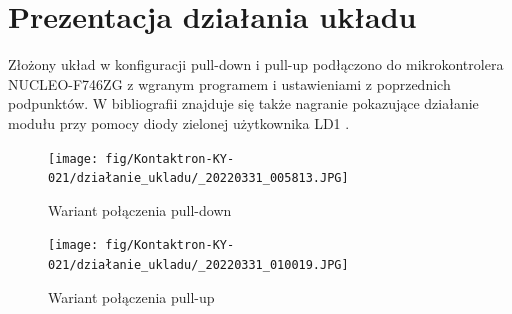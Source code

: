 \documentclass[11pt, a4paper]{article}
\begin{document}

\section{Prezentacja działania układu}
Złożony układ w konfiguracji pull-down i pull-up podłączono do mikrokontrolera NUCLEO-F746ZG z wgranym programem i ustawieniami z poprzednich podpunktów. W bibliografii znajduje się także nagranie pokazujące działanie modułu przy pomocy diody zielonej użytkownika LD1 \cite{youtube}.


\vspace{0.5cm}
\begin{figure}[H]
  \centering
  \texttt{[image: fig/Kontaktron-KY-021/działanie\_ukladu/\_20220331\_005813.JPG]}
  \label{fig:sub1}
  \caption{Wariant połączenia pull-down}
\end{figure}
\vspace{0.5cm}

\vspace{0.5cm}
\begin{figure}[H]
  \centering
  \texttt{[image: fig/Kontaktron-KY-021/działanie\_ukladu/\_20220331\_010019.JPG]}
  \label{fig:sub2}
  \caption{Wariant połączenia pull-up}
\end{figure}
\vspace{0.5cm}
\end{document}
